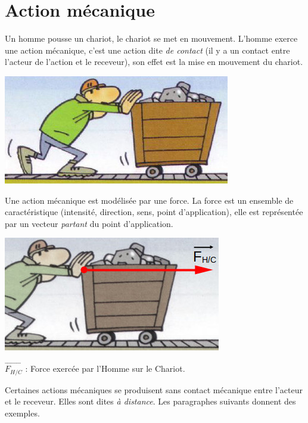 \section{Action mécanique}
%
Un homme pousse un chariot, le chariot se met en mouvement. L'homme exerce une action mécanique, c'est une action dite {\it de contact} (il y a un contact entre l'acteur de l'action et le receveur), son effet est la mise en mouvement du chariot.

\begin{center}
\includegraphics[scale=0.6]{./forces/chariotPousse}
\end{center}

Une action mécanique est modélisée par une force. La force est un ensemble de caractéristique (intensité, direction, sens, point d'application), elle est représentée par un vecteur {\it partant} du point d'application.

\begin{center}
\includegraphics[scale=0.6]{./forces/chariotPousseForce}

$\overrightarrow{F_{H/C}}$ : Force exercée par l'Homme sur le Chariot.
\end{center}

Certaines actions mécaniques se produisent sans contact mécanique entre l'acteur et le receveur. Elles sont dites {\it à distance}. Les paragraphes suivants donnent des exemples.

